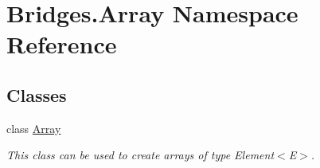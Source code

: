 \hypertarget{namespace_bridges_1_1_array}{}\section{Bridges.\+Array Namespace Reference}
\label{namespace_bridges_1_1_array}
\subsection*{Classes}
\begin{DoxyCompactItemize}
\item 
class \mbox{\hyperlink{class_bridges_1_1_array_1_1_array}{Array}}
\begin{DoxyCompactList}\small\item\em This class can be used to create arrays of type Element$<$\+E$>$. \end{DoxyCompactList}\end{DoxyCompactItemize}
